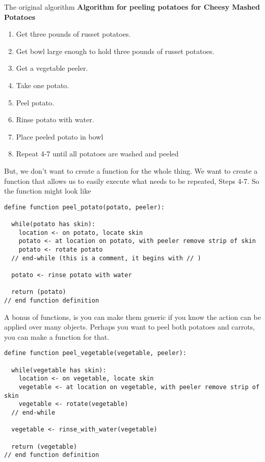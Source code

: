 \documentclass[
]{book}
\providecommand{\tightlist}{%
  \setlength{\itemsep}{0pt}\setlength{\parskip}{0pt}}
\begin{document}
The original algorithm
\textbf{Algorithm for peeling potatoes for Cheesy Mashed Potatoes}

\begin{enumerate}
\def\labelenumi{\arabic{enumi}.}
\tightlist
\item
  Get three pounds of russet potatoes.
\item
  Get bowl large enough to hold three pounds of russet potatoes.
\item
  Get a vegetable peeler.
\item
  Take one potato.
\item
  Peel potato.
\item
  Rinse potato with water.
\item
  Place peeled potato in bowl
\item
  Repeat 4-7 until all potatoes are washed and peeled
\end{enumerate}

But, we don't want to create a function for the whole thing. We want to create a function that allows us to easily execute what needs to be repeated, Steps 4-7. So the function might look like

\begin{verbatim}
define function peel_potato(potato, peeler):

  while(potato has skin):
    location <- on potato, locate skin
    potato <- at location on potato, with peeler remove strip of skin
    potato <- rotate potato
  // end-while (this is a comment, it begins with // )
  
  potato <- rinse potato with water
  
  return (potato)
// end function definition
\end{verbatim}

A bonus of functions, is you can make them generic if you know the action can be applied over many objects. Perhaps you want to peel both potatoes and carrots, you can make a function for that.

\begin{verbatim}
define function peel_vegetable(vegetable, peeler):

  while(vegetable has skin):
    location <- on vegetable, locate skin
    vegetable <- at location on vegetable, with peeler remove strip of skin
    vegetable <- rotate(vegetable)
  // end-while
  
  vegetable <- rinse_with_water(vegetable)
  
  return (vegetable)
// end function definition
\end{verbatim}
\end{document}
